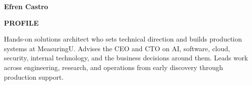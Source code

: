 \documentclass[10pt,letterpaper]{article}
\newcommand{\resumeSection}[1]{%
  \vspace{6pt}%
  {\color{navy}\bfseries\fontsize{11.5}{13}\selectfont\MakeUppercase{#1}}\par
  \vspace{1pt}{\color{navy}\rule{\textwidth}{0.7pt}}\vspace{1.5pt}
}
\begin{document}
\raggedright
\fontsize{10.7}{13}\selectfont

{\color{navy}\bfseries\fontsize{30}{32}\selectfont Efren Castro}\par
{}\par
{}\par
{}\par
\vspace{2pt}{\color{navy}\rule{\textwidth}{1.1pt}}

\resumeSection{Profile}
Hands-on solutions architect who sets technical direction and builds production systems at MeasuringU. Advises the CEO and CTO on AI, software, cloud, security, internal technology, and the business decisions around them. Leads work across engineering, research, and operations from early discovery through production support.
\end{document}
